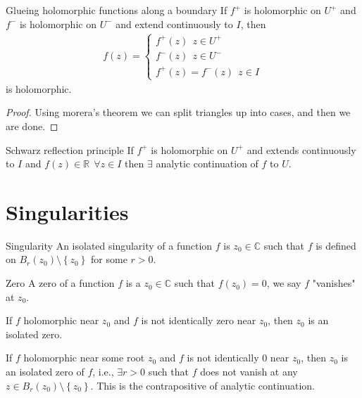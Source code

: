 \documentclass{article}
\begin{document}
\begin{thrm}{Glueing holomorphic functions along a boundary}{}
If \( f^+ \) is holomorphic on \( U^+ \) and \( f^- \) is holomorphic on \( U^- \) and extend continuously to \( I \), then 
\begin{align*}
    f(z) = 
    \begin{cases}
        f^+(z) \ \  z \in U^+ \\ 
        f^-(z) \ \ z \in U^- \\
        f^+(z) = f^-(z) \ \ z \in I 
    \end{cases}
\end{align*}
is holomorphic. 
\tcbline
\begin{proof}
Using morera's theorem we can split triangles up into cases, and then we are done. 
\end{proof}

\end{thrm}
\begin{thrm}{Schwarz reflection principle}{}
If \( f^+ \) is holomorphic on \( U^+ \) and extends continuously to \( I \) and \( f(z) \in \mathbb{R}  \ \ \forall z\in I \) then \( \exists  \) analytic continuation of \( f \) to \( U \). 
\end{thrm}

\section{Singularities}

\begin{defn}{Singularity}{}
An isolated singularity of a function \( f \) is \( z_0 \in \mathbb{C}  \) such that \( f \) is defined on \( B_{r} (z_0)\setminus \left\{ z_0 \right\}  \) for some \( r>0 \).
\end{defn}

\begin{defn}{Zero}{}
A zero of a function \( f \) is a \( z_0 \in \mathbb{C}   \) such that \( f(z_0) = 0 \), we say \( f \) "vanishes" at \( z_0 \). 
\end{defn}
\begin{thrm}{}{}
If \( f \) holomorphic near \( z_0 \) and \( f \) is not identically zero near \( z_0 \), then \( z_0 \) is an isolated zero. 
\end{thrm}

\begin{thrm}{}{}
If \( f \) holomorphic near some root \( z_0 \) and \( f \) is not identically \( 0 \) near \( z_0 \), then \( z_0 \) is an isolated zero of \( f \), i.e., \( \exists r>0 \) such that \( f \) does not vanish at any \( z \in B_{r} (z_0) \setminus \left\{ z_{0}  \right\} \). This is the contrapositive of analytic continuation.
\end{thrm}
\end{document}
